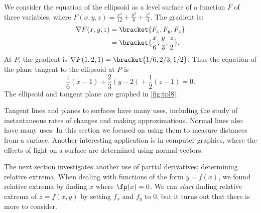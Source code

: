 {We consider the equation of the ellipsoid as a level surface of a function $F$ of three variables, where $F(x,y,z) = \frac{x^2}{12} +\frac{y^2}{6}+\frac{z^2}{4}$.  The gradient is:
%
%
\begin{align*}
\nabla F(x,y,z) &=\bracket{F_x, F_y,F_z}\\
			&=\bracket{\frac x6, \frac y3, \frac z2}.
\end{align*}
At  $P$, the gradient is $\nabla F(1,2,1) =\bracket{1/6, 2/3, 1/2}$. Thus the equation of the plane tangent to the ellipsoid at $P$ is
\[\frac 16(x-1) + \frac23(y-2) + \frac 12(z-1) = 0.\]
The ellipsoid and tangent plane are graphed in \autoref{fig:tpl8}.}

Tangent lines and planes to surfaces have many uses, including the study of instantaneous rates of changes and making approximations. Normal lines also have many uses. In this section we focused on using them to measure distances from a surface. Another interesting application is in computer graphics, where the effects of light on a surface are determined using normal vectors.\bigskip

The next section investigates another use of partial derivatives: determining relative extrema. When dealing with functions of the form $y=f(x)$, we found relative extrema  by finding $x$ where $\fp(x) = 0$. We can \textit{start} finding relative extrema of $z=f(x,y)$ by setting $f_x$ and $f_y$ to 0, but it turns out that there is more to consider.

